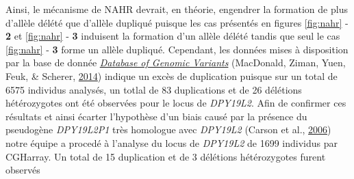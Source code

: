 \documentclass[12pt,twoside]{reedthesis}
\theoremstyle{definition}
\theoremstyle{definition}
\theoremstyle{remark}
\begin{document}
  Ainsi, le mécanisme de NAHR devrait, en théorie, engendrer la formation
  de plus d'allèle délété que d'allèle dupliqué puisque les cas présentés
  en figures \ref{fig:nahr} - \textbf{2} et \ref{fig:nahr} - \textbf{3}
  induisent la formation d'un allèle délété tandis que seul le cas
  \ref{fig:nahr} - \textbf{3} forme un allèle dupliqué. Cependant, les
  données mises à disposition par la base de donnée
  \href{http://dgv.tcag.ca/dgv/app/home}{\emph{Database of Genomic
  Variants}} (MacDonald, Ziman, Yuen, Feuk, \& Scherer,
  \protect\hyperlink{ref-MacDonald2014}{2014}) indique un excès de
  duplication puisque sur un total de 6575 individus analysés, un totlal
  de 83 duplications et de 26 délétions hétérozygotes ont été observées
  pour le locus de \emph{DPY19L2}. Afin de confirmer ces résultats et
  ainsi écarter l'hypothèse d'un biais causé par la présence du pseudogène
  \emph{DPY19L2P1} très homologue avec \emph{DPY19L2} (Carson et al.,
  \protect\hyperlink{ref-Carson2006}{2006}) notre équipe a procedé à
  l'analyse du locus de \emph{DPY19L2} de 1699 individus par CGHarray. Un
  total de 15 duplication et de 3 délétions hétérozygotes furent observés
  
\end{document}
